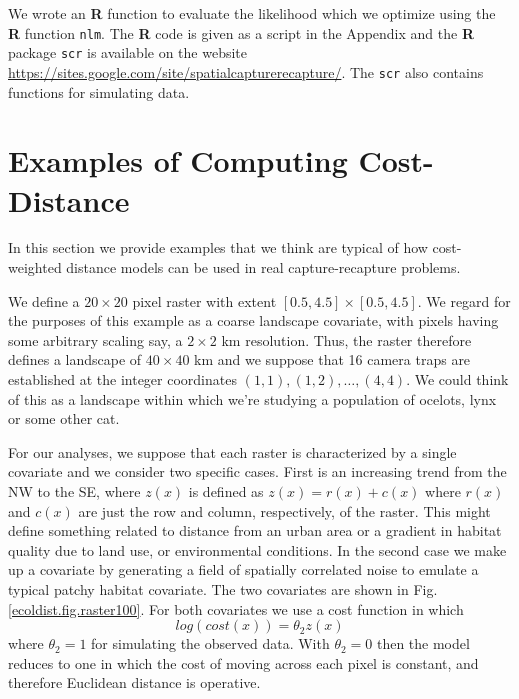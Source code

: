 \documentclass[12pt]{article}
\begin{document}
We wrote an {\bf R} function to evaluate the likelihood which we optimize
using the {\bf R} function \mbox{\tt nlm}.
The {\bf R} code is given as a script in the Appendix and the {\bf R}
package \mbox{\tt scr}
is available on the website
\url{https://sites.google.com/site/spatialcapturerecapture/}. The
\mbox{\tt scr} also contains
functions for simulating data.


\section{Examples of Computing Cost-Distance}

In this section we provide examples that we think are typical of
how cost-weighted distance models can be used in real
capture-recapture problems.

We define a $20 \times 20$ pixel raster with
extent $[0.5, 4.5] \times [0.5, 4.5]$.
We regard for the purposes of this example as a coarse landscape
covariate, with pixels having some arbitrary scaling say, a $2 \times 2$ km resolution. Thus, the raster
therefore
defines a landscape of $40 \times 40$ km and we suppose that 16 camera
traps are established at the integer coordinates $(1,1), (1,2), \ldots,
(4,4)$. We could think of this as a landscape within which we're
studying a population of ocelots, lynx or some other cat.

For our analyses, we suppose
that each raster is characterized by a single covariate and we consider two specific
cases. First is an increasing trend from
the NW to the SE, where $z(x)$ is defined as $z(x) = r(x) + c(x)$ where $r(x)$ and $c(x)$ are
just the row and column, respectively, of the raster.
This might define something related to distance
from an urban area or a gradient in habitat quality due to land use,
or environmental conditions.
In the second case we make up a covariate by generating a field of spatially correlated
noise to emulate a typical patchy habitat covariate. The two covariates are shown in
Fig. \ref{ecoldist.fig.raster100}. For both covariates we use a cost
function in which
\[
 log(cost(x))=  \theta_2 z(x)
\]
where $\theta_2 = 1$ for simulating the observed data.
 With $\theta_2=0$ then the
model reduces to one in which the cost of moving across each pixel is
constant, and therefore Euclidean distance is operative.
\end{document}
